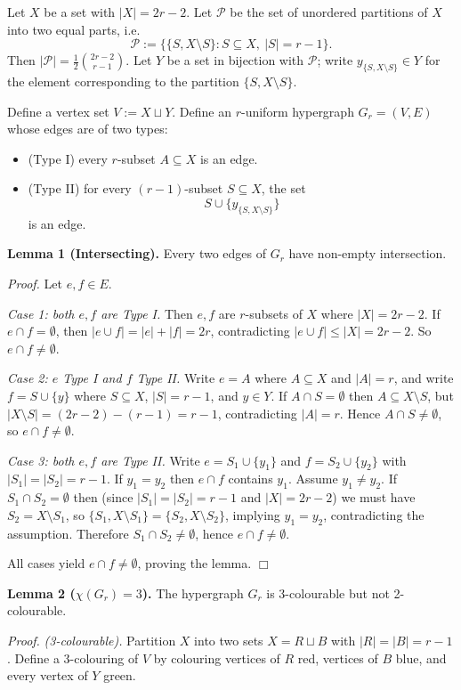 Let $X$ be a set with $|X|=2r-2$.
Let $\mathcal P$ be the set of unordered partitions of $X$ into two equal parts, i.e.
\[
\mathcal P:=\big\{\{S, X\setminus S\}: S\subseteq X,\ |S|=r-1\big\}.
\]
Then $|\mathcal P|=\frac12\binom{2r-2}{r-1}$.
Let $Y$ be a set in bijection with $\mathcal P$; write $y_{\{S,X\setminus S\}}\in Y$ for the element corresponding to the partition $\{S,X\setminus S\}$.

Define a vertex set $V:=X\sqcup Y$.
Define an $r$-uniform hypergraph $G_r=(V,E)$ whose edges are of two types:
\begin{itemize}
\item (Type I) every $r$-subset $A\subseteq X$ is an edge.
\item (Type II) for every $(r-1)$-subset $S\subseteq X$, the set
\[
S\cup\{y_{\{S,X\setminus S\}}\}
\]
is an edge.
\end{itemize}

\medskip
\noindent\textbf{Lemma 1 (Intersecting).}
Every two edges of $G_r$ have non-empty intersection.

\noindent\emph{Proof.}
Let $e,f\in E$.

\emph{Case 1: both $e,f$ are Type I.}
Then $e,f$ are $r$-subsets of $X$ where $|X|=2r-2$.
If $e\cap f=\emptyset$, then $|e\cup f|=|e|+|f|=2r$, contradicting $|e\cup f|\le |X|=2r-2$.
So $e\cap f\neq\emptyset$.

\emph{Case 2: $e$ Type I and $f$ Type II.}
Write $e=A$ where $A\subseteq X$ and $|A|=r$, and write $f=S\cup\{y\}$ where $S\subseteq X$, $|S|=r-1$, and $y\in Y$.
If $A\cap S=\emptyset$ then $A\subseteq X\setminus S$, but $|X\setminus S|=(2r-2)-(r-1)=r-1$, contradicting $|A|=r$.
Hence $A\cap S\neq\emptyset$, so $e\cap f\neq\emptyset$.

\emph{Case 3: both $e,f$ are Type II.}
Write $e=S_1\cup\{y_1\}$ and $f=S_2\cup\{y_2\}$ with $|S_1|=|S_2|=r-1$.
If $y_1=y_2$ then $e\cap f$ contains $y_1$.
Assume $y_1\neq y_2$.
If $S_1\cap S_2=\emptyset$ then (since $|S_1|=|S_2|=r-1$ and $|X|=2r-2$) we must have $S_2=X\setminus S_1$, so $\{S_1,X\setminus S_1\}=\{S_2,X\setminus S_2\}$, implying $y_1=y_2$, contradicting the assumption.
Therefore $S_1\cap S_2\neq\emptyset$, hence $e\cap f\neq\emptyset$.

All cases yield $e\cap f\neq\emptyset$, proving the lemma. \hfill$\Box$

\medskip
\noindent\textbf{Lemma 2 ($\chi(G_r)=3$).}
The hypergraph $G_r$ is 3-colourable but not 2-colourable.

\noindent\emph{Proof.}
\emph{(3-colourable).}
Partition $X$ into two sets $X=R\sqcup B$ with $|R|=|B|=r-1$.
Define a 3-colouring of $V$ by colouring vertices of $R$ red, vertices of $B$ blue, and every vertex of $Y$ green.

